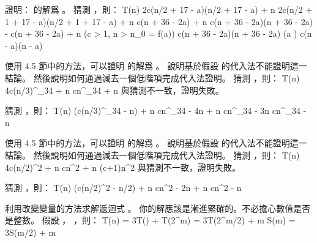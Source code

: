 \startEXERCISE
證明：  的解爲 。
\stopEXERCISE
\startANSWER
猜測 ，則：
\startformula\startmathalignment[n=3]
\NC T(n) \NC \le 2c(\lfloor n/2 \rfloor + 17 - a)\lg(\lfloor n/2 \rfloor + 17 - a) + n \NC \NR
\NC      \NC \le 2c(n/2 + 1 + 17 - a)\lg(n/2 + 1 + 17 - a) + n \NC \NR
\NC      \NC \le c(n + 36 - 2a)\lg{} + n \NC \NR
\NC      \NC \le c(n + 36 - 2a)\lg(n + 36 - 2a) - c(n + 36 - 2a) + n \qquad\NC (c > 1, n > n_0 = f(a))\NR
\NC      \NC \le c(n + 36 - 2a)\lg(n + 36 - 2a)                      \NC (a ) \NR
\NC      \NC \le c(n - a)\lg(n - a) \NC \NR
\stopmathalignment\stopformula
\stopANSWER

\startEXERCISE
使用 4.5 節中的方法，可以證明  的解爲 。
說明基於假設  的代入法不能證明這一結論。
然後說明如何通過減去一個低階項完成代入法證明。
\stopEXERCISE
\startANSWER
猜測 ，則：
\startformula\startmathalignment
\NC T(n) \NC \le 4c(n/3)^{\log_3{4}} + n \NR
\NC      \NC \le cn^{\log_3{4}} + n \NR
\stopmathalignment\stopformula
與猜測不一致，證明失敗。

猜測 ，則：
\startformula\startmathalignment
\NC T(n) \NC {}\Big(c(n/3)^{\log_3{4}} - n\Big) + n \NR
\NC      \NC \le cn^{\log_3{4}} - 4n + n \NR
\NC      \NC \le cn^{\log_3{4}} - 3n \NR
\NC      \NC \le cn^{\log_3{4}} - n \NR
\stopmathalignment\stopformula
\stopANSWER

\startEXERCISE
使用 4.5 節中的方法，可以證明  的解爲 。
說明基於假設  的代入法不能證明這一結論。
然後說明如何通過減去一個低階項完成代入法證明。
\stopEXERCISE
\startANSWER
猜測 ，則：
\startformula\startmathalignment
\NC T(n) \NC \le 4c(n/2)^2 + n \NR
\NC      \NC \le cn^2 + n \NR
\NC      \NC \le (c+1)n^2 \NR
\stopmathalignment\stopformula
與猜測不一致，證明失敗。

猜測 ，則：
\startformula\startmathalignment
\NC T(n) \NC {}\Big(c(n/2)^2 - n/2\Big) + n \NR
\NC      \NC \le cn^2 - 2n + n \NR
\NC      \NC \le cn^2 - n \NR
\stopmathalignment\stopformula
\stopANSWER

\startEXERCISE
利用改變變量的方法求解遞迴式 。
你的解應該是漸進緊確的。不必擔心數值是否是整數。
\stopEXERCISE
\startANSWER
假設 ， ，則：
\startformula\startmathalignment
\NC T(n)   \NC = 3T() +  \NR
\NC T(2^m) \NC = 3T(2^{m/2}) + m \NR
\NC S(m)   \NC = 3S(m/2) + m \NR
\stopmathalignment\stopformula

